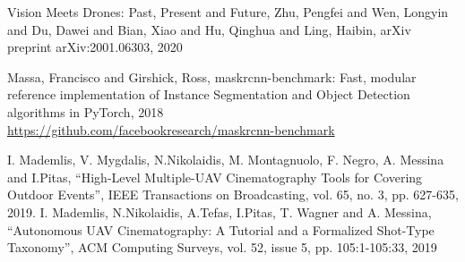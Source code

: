 \documentclass{article}
\begin{document}
\begin{thebibliography}{}
 Vision Meets Drones: Past, Present and Future, Zhu, Pengfei and Wen, Longyin and Du, Dawei and Bian, Xiao and Hu, Qinghua and Ling, Haibin, arXiv preprint arXiv:2001.06303, 2020

 Massa, Francisco and Girshick, Ross,
maskrcnn-benchmark: Fast, modular reference implementation of Instance Segmentation and Object Detection algorithms in PyTorch, 2018\\
\url{https://github.com/facebookresearch/maskrcnn-benchmark}

 I. Mademlis, V. Mygdalis, N.Nikolaidis, M. Montagnuolo, F. Negro, A. Messina and I.Pitas, “High-Level Multiple-UAV Cinematography Tools for Covering Outdoor Events”, IEEE Transactions on Broadcasting, vol. 65, no. 3, pp. 627-635, 2019. I. Mademlis, N.Nikolaidis, A.Tefas, I.Pitas, T. Wagner and A. Messina, “Autonomous UAV Cinematography: A Tutorial and a Formalized Shot-Type Taxonomy”, ACM Computing Surveys, vol. 52, issue 5, pp. 105:1-105:33, 2019


\end{thebibliography}
\end{document}
